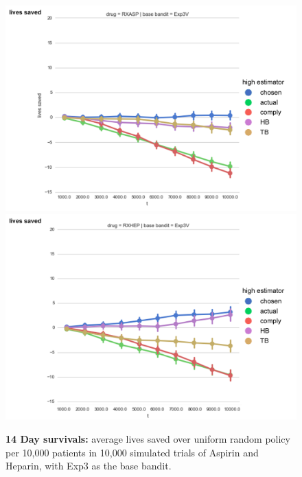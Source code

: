 \begin{figure}
\begin{center}
\includegraphics[width=1\columnwidth]{bandit/figs/fig1-1.jpg}
\includegraphics[width=1\columnwidth]{bandit/figs/fig1-2.jpg}
\caption{\textbf{14 Day survivals:} average lives saved over uniform random policy per 10,000 patients in 10,000 simulated trials of Aspirin and Heparin, with Exp3 as the base bandit.}
\end{center}
\end{figure} 
